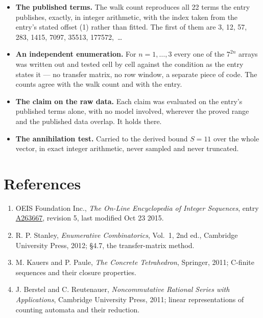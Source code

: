 \documentclass[11pt]{article}
\theoremstyle{definition}
\begin{document}
\begin{itemize}

\item {\bfseries The published terms.} The walk count reproduces all 22 terms the entry publishes, exactly, in integer arithmetic, with the index taken from the entry's stated offset (1) rather than fitted. The first of them are 3, 12, 57, 283, 1415, 7097, 35513, 177572,~\dots

\item {\bfseries An independent enumeration.} For $n = 1,\dots,3$ every one of the $7^{2n}$ arrays was written out and tested cell by cell against the condition as the entry states it --- no transfer matrix, no row window, a separate piece of code. The counts agree with the walk count and with the entry.

\item {\bfseries The claim on the raw data.} Each claim was evaluated on the entry's published terms alone, with no model involved, wherever the proved range and the published data overlap. It holds there.

\item {\bfseries The annihilation test.} Carried to the derived bound $S = 11$ over the whole vector, in exact integer arithmetic, never sampled and never truncated.

\end{itemize}

\section{References}

\begin{enumerate}

\item OEIS Foundation Inc., \emph{The On-Line Encyclopedia of Integer Sequences}, entry \href{https://oeis.org/A263667}{A263667}, revision 5, last modified Oct 23 2015.

\item R. P. Stanley, \emph{Enumerative Combinatorics}, Vol.~1, 2nd ed., Cambridge University Press, 2012; \S4.7, the transfer-matrix method.

\item M. Kauers and P. Paule, \emph{The Concrete Tetrahedron}, Springer, 2011; C-finite sequences and their closure properties.

\item J. Berstel and C. Reutenauer, \emph{Noncommutative Rational Series with Applications}, Cambridge University Press, 2011; linear representations of counting automata and their reduction.

\end{enumerate}
\end{document}
